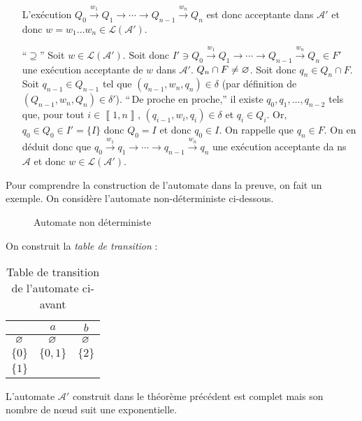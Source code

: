 \begin{prv}
\begin{itemize}
			L'exécution $Q_0 \xrightarrow{w_1} Q_1 \to \cdots \to Q_{n-1} \xrightarrow{w_n} Q_n$ est donc acceptante dans $\mathcal{A}'$\/ et donc $w = w_1\ldots w_n \in \mathcal{L}(\mathcal{A}')$.
		\item[``$\supseteq$''] Soit $w \in \mathcal{L}(\mathcal{A}')$. Soit donc $I'\ni Q_0 \xrightarrow{w_1} Q_1\to \cdots\to Q_{n-1}\xrightarrow{w_n} Q_n \in F'$\/ une exécution acceptante de $w$\/ dans $\mathcal{A}'$.
		$Q_n \cap  F \neq \varnothing$. Soit donc $q_n \in Q_n \cap F$. Soit $q_{n-1} \in Q_{n-1}$\/ tel que $(q_{n-1}, w_n, q_n) \in \delta$ (par définition de $(Q_{n-1}, w_n, Q_n) \in \delta'$).
			``\,De proche en proche,'' il existe $q_0,q_1,\ldots,q_{n-2}$\/ tels que, pour tout $i \in \left\llbracket 1,n \right\rrbracket$, $(q_{i-1}, w_i, q_i) \in \delta$ et $q_i \in Q_i$.
			Or, $q_0 \in Q_0 \in I' = \{I\}$\/ donc $Q_0 = I$ et donc $q_0 \in I$.
			On rappelle que $q_n \in F$. On en déduit donc que $q_0 \xrightarrow{w_1} q_1 \to \cdots \to q_{n-1} \xrightarrow{w_n} q_n$ une exécution acceptante da ns $\mathcal{A}$\/ et donc $w \in \mathcal{L}(\mathcal{A}')$.
	\end{itemize}
\end{prv}

Pour comprendre la construction de l'automate dans la preuve, on fait un exemple. On considère l'automate non-déterministe ci-dessous.

\begin{figure}[H]
	\centering
	\caption{Automate non déterministe}
\end{figure}

On construit la {\it table de transition}\/ :

\begin{table}[H]
	\centering
	\begin{tabular}{c|c|c}
		&$a$&$b$\\\hline
		$\varnothing$&$\varnothing$&$\varnothing$\\ \hline
		$\{0\}$&$\{0,1\}$&$\{2\}$\\ \hline
		$\{1\}$&
	\end{tabular}
	\caption{Table de transition de l'automate ci-avant}
\end{table}


\begin{rmk}
	L'automate $\mathcal{A}'$\/ construit dans le théorème précédent est complet mais son nombre de nœud suit une exponentielle.
\end{rmk}

